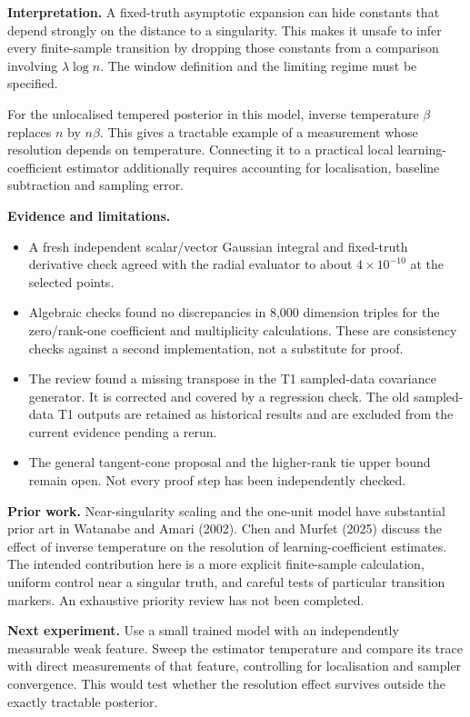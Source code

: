 \documentclass[11pt,a4paper]{article}
\begin{document}
\newpage
\textbf{Interpretation.} A fixed-truth asymptotic expansion can hide constants that depend strongly on the distance to a singularity. This makes it unsafe to infer every finite-sample transition by dropping those constants from a comparison involving $\lambda\log n$. The window definition and the limiting regime must be specified.

For the unlocalised tempered posterior in this model, inverse temperature $\beta$ replaces $n$ by $n\beta$. This gives a tractable example of a measurement whose resolution depends on temperature. Connecting it to a practical local learning-coefficient estimator additionally requires accounting for localisation, baseline subtraction and sampling error.

\textbf{Evidence and limitations.}
\begin{itemize}
\item A fresh independent scalar/vector Gaussian integral and fixed-truth derivative check agreed with the radial evaluator to about $4\times10^{-10}$ at the selected points.
\item Algebraic checks found no discrepancies in 8,000 dimension triples for the zero/rank-one coefficient and multiplicity calculations. These are consistency checks against a second implementation, not a substitute for proof.
\item The review found a missing transpose in the T1 sampled-data covariance generator. It is corrected and covered by a regression check. The old sampled-data T1 outputs are retained as historical results and are excluded from the current evidence pending a rerun.
\item The general tangent-cone proposal and the higher-rank tie upper bound remain open. Not every proof step has been independently checked.
\end{itemize}

\textbf{Prior work.} Near-singularity scaling and the one-unit model have substantial prior art in Watanabe and Amari (2002). Chen and Murfet (2025) discuss the effect of inverse temperature on the resolution of learning-coefficient estimates. The intended contribution here is a more explicit finite-sample calculation, uniform control near a singular truth, and careful tests of particular transition markers. An exhaustive priority review has not been completed.

\textbf{Next experiment.} Use a small trained model with an independently measurable weak feature. Sweep the estimator temperature and compare its trace with direct measurements of that feature, controlling for localisation and sampler convergence. This would test whether the resolution effect survives outside the exactly tractable posterior.
\end{document}

